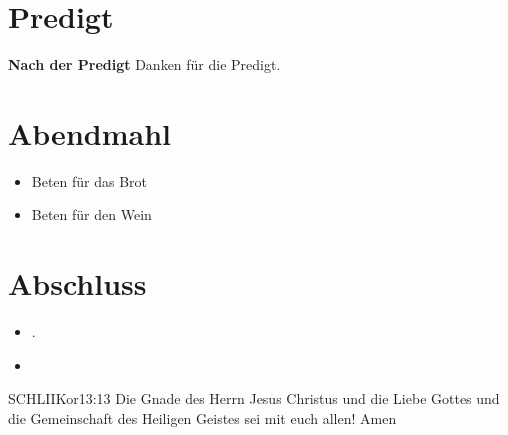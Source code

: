 \documentclass[fontsize=14pt]{mybib}
\begin{document}
\section{Predigt}
\textbf{Nach der Predigt}\newline
Danken für die Predigt.
\section{Abendmahl}
\begin{itemize}
    \item [] Beten für das Brot
    \item [] Beten für den Wein
\end{itemize}
\section{Abschluss}
\begin{itemize}
    \item [] .
    \item [] 
\end{itemize}
\begin{bibelbox}{SCHL}{IIKor}{13:13}
    Die Gnade des Herrn Jesus Christus und die Liebe Gottes und die Gemeinschaft des Heiligen Geistes sei mit euch allen! Amen
\end{bibelbox}
\end{document}
